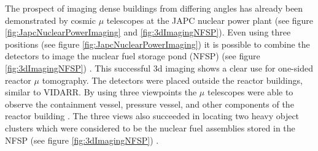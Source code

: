 The prospect of imaging dense buildings from differing angles has already been demonstrated by cosmic $\mu$ telescopes at the JAPC nuclear power plant (see figure \ref{fig:JapcNuclearPowerImaging} and \ref{fig:3dImagingNFSP}). Even using three positions (see figure \ref{fig:JapcNuclearPowerImaging}) it is possible to combine the detectors to image the nuclear fuel storage pond (NFSP) (see figure \ref{fig:3dImagingNFSP}) \cite{Fujii_ReactorRadiography_2019}. This successful 3d imaging shows a clear use for one-sided reactor $\mu$ tomography. The detectors were placed outside the reactor buildings, similar to VIDARR. By using three viewpoints the $\mu$ telescopes were able to observe the containment vessel, pressure vessel, and other components of the reactor building \cite{Fujii_ReactorRadiography_2019}. The three views also succeeded in locating two heavy object clusters which were considered to be the nuclear fuel assemblies stored in the NFSP (see figure \ref{fig:3dImagingNFSP}) \cite{Fujii_ReactorRadiography_2019}.

